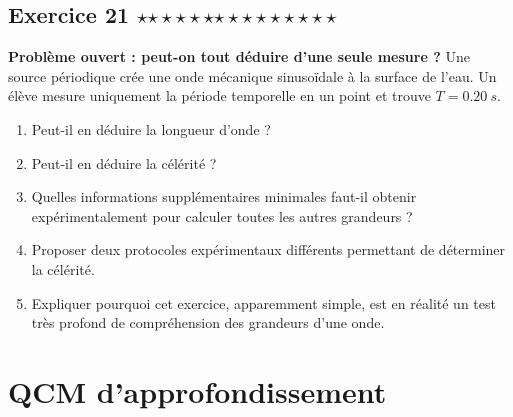 \documentclass[11pt,a4paper]{article}
\newcommand{\etoiles}[1]{%
\ifcase#1\or $\star$\or $\star\star$\or $\star\star\star$\or $\star\star\star\star$\or $\star\star\star\star\star$\fi}
\newcommand{\exostar}[2]{\subsection*{Exercice #1 \hfill \etoiles{#2}}}
\begin{document}
\exostar{21}{5}
\textbf{Problème ouvert : peut-on tout déduire d'une seule mesure ?}
Une source périodique crée une onde mécanique sinusoïdale à la surface de l'eau. Un élève mesure uniquement la période temporelle en un point et trouve $T=\SI{0,20}{s}$.
\begin{enumerate}[label=\alph*)]
    \item Peut-il en déduire la longueur d'onde ?
    \item Peut-il en déduire la célérité ?
    \item Quelles informations supplémentaires minimales faut-il obtenir expérimentalement pour calculer toutes les autres grandeurs ?
    \item Proposer deux protocoles expérimentaux différents permettant de déterminer la célérité.
    \item Expliquer pourquoi cet exercice, apparemment simple, est en réalité un test très profond de compréhension des grandeurs d'une onde.
\end{enumerate}

\section{QCM d'approfondissement}
\end{document}
